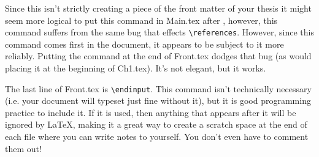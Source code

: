 Since this isn't strictly creating a piece of the front matter of your thesis it might seem more logical to put this command in Main.tex after \verb==, however, this command suffers from the same bug that effects \verb=\references=.  However, since this command comes first in the document, it appears to be subject to it more reliably.  Putting the command at the end of Front.tex dodges that bug (as would placing it at the beginning of Ch1.tex).  It's not elegant, but it works.

The last line of Front.tex is \verb=\endinput=.  This command isn't technically necessary (i.e. your document will typeset just fine without it), but it is good programming practice to include it.  If it is used, then anything that appears after it will be ignored by \LaTeX, making it a great way to create a scratch space at the end of each file where you can write notes to yourself.  You don't even have to comment them out!
\endinput

This is a note to myself which is ignored by LaTeX due to the \endinput command above it.